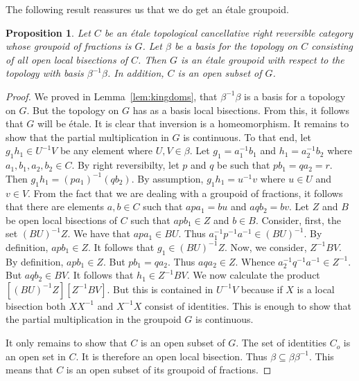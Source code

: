 \documentclass[a4paper]{amsart}
\newtheorem{proposition}[theorem]{Proposition}
\begin{document}
The following result reassures us that we do get an \'etale groupoid.

\begin{proposition}\label{prop:main} Let $C$ be an \'etale topological cancellative right reversible category whose groupoid of fractions is $G$. 
Let $\beta$ be a basis for the topology on $C$ consisting of all open local bisections of $C$.
Then $G$ is an \'etale groupoid with respect to the topology with basis $\beta^{-1} \beta$.
In addition, $C$ is an open subset of $G$.
\end{proposition}
\begin{proof} 
We proved in Lemma~\ref{lem:kingdoms}, that $\beta^{-1} \beta$ is a basis for a topology on $G$. 
But the topology on $G$ has as a basis local bisections.
From this, it follows that $G$ will be \'etale.
It is clear that inversion is a homeomorphism.
It remains to show that the partial multiplication in $G$ is continuous.
To that end, 
let $g_{1}h_{1} \in U^{-1}V$ be any element where $U,V \in \beta$.
Let $g_{1} = a_{1}^{-1}b_{1}$ and $h_{1} = a_{2}^{-1}b_{2}$ where $a_{1},b_{1},a_{2},b_{2} \in C$.
By right reversibilty, 
let $p$ and $q$ be such that $pb_{1} = qa_{2} = r$.
Then $g_{1}h_{1} = (pa_{1})^{-1}(qb_{2})$.
By assumption, $g_{1}h_{1} = u^{-1}v$ where $u \in U$ and $v \in V$.
From the fact that we are dealing with a groupoid of fractions, 
it follows that there are elements $a,b \in C$ such that
$apa_{1} = bu$ and $aqb_{2} = bv$.
Let $Z$ and $B$ be open local bisections of $C$ such that 
$apb_{1} \in Z$ and $b \in B$.
Consider, first, the set $(BU)^{-1}Z$.
We have that $apa_{1} \in BU$.
Thus $a_{1}^{-1}p^{-1}a^{-1} \in (BU)^{-1}$.
By definition, $apb_{1} \in Z$.
It follows that $g_{1} \in (BU)^{-1}Z$.
Now, we consider, $Z^{-1}BV$.
By definition, $apb_{1} \in Z$.
But $pb_{1} = qa_{2}$.
Thus $aqa_{2} \in Z$.
Whence $a_{2}^{-1}q^{-1}a^{-1} \in Z^{-1}$.
But $aqb_{2} \in BV$.
It follows that $h_{1} \in Z^{-1}BV$.
We now calculate the product $[(BU)^{-1}Z][Z^{-1}BV]$.
But this is contained in $U^{-1}V$
because if $X$ is a local bisection
both $XX^{-1}$ and $X^{-1}X$ consist of identities.
This is enough to show that the partial multiplication in the groupoid $G$ is continuous. 

It only remains to show that $C$ is an open subset of $G$.
The set of identities $C_{o}$ is an open set
in $C$. It is therefore an open local bisection.
Thus $\beta \subseteq \beta \beta^{-1}$.
This means that $C$ is an open subset of its groupoid of fractions.
\end{proof}
\end{document}
